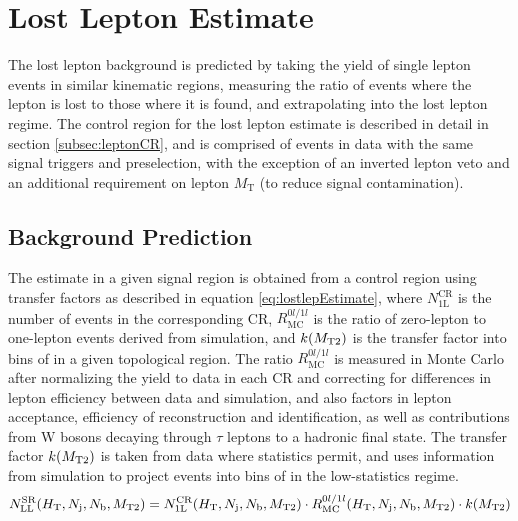\section{Lost Lepton Estimate}
\label{sec:lostlep}

The lost lepton background is predicted by taking the yield of single lepton events in similar kinematic regions, measuring the ratio of events where the lepton is lost to those where it is found, and extrapolating into the lost lepton regime. The control region for the lost lepton estimate is described in detail in section \ref{subsec:leptonCR}, and is comprised of events in data with the same signal triggers and preselection, with the exception of an inverted lepton veto and an additional requirement on lepton $M_{\mathrm{T}}$ (to reduce signal contamination). 

\subsection{Background Prediction}
\label{subsec:lostlepPrediction}

The estimate in a given signal region is obtained from a control region using transfer factors as described in equation \ref{eq:lostlepEstimate}, where $N_{\mathrm{1L}}^{\mathrm{CR}}$ is the number of events in the corresponding CR, $R_{\mathrm{MC}}^{0l/1l}$ is the ratio of zero-lepton to one-lepton events derived from simulation, and $k(M_{\mathrm{T2}})$ is the transfer factor into bins of \mttwo in a given topological region. The ratio $R_{\mathrm{MC}}^{0l/1l}$ is measured in Monte Carlo after normalizing the yield to data in each CR and correcting for differences in lepton efficiency between data and simulation, and also factors in lepton acceptance, efficiency of reconstruction and identification, as well as contributions from W bosons decaying through $\tau$ leptons to a hadronic final state. The \mttwo transfer factor $k(M_{\mathrm{T2}})$ is taken from data where statistics permit, and uses information from simulation to project events into bins of \mttwo in the low-statistics regime.
\begin{equation}
	N_{\mathrm{LL}}^{\mathrm{SR}}(H_{\mathrm{T}},N_\mathrm{j},N_\mathrm{b},M_{\mathrm{T2}}) = N_{\mathrm{1L}}^{\mathrm{CR}}(H_{\mathrm{T}},N_\mathrm{j},N_\mathrm{b},M_{\mathrm{T2}}) \cdot R_{\mathrm{MC}}^{0l/1l}(H_{\mathrm{T}},N_\mathrm{j},N_\mathrm{b},M_{\mathrm{T2}}) \cdot k(M_{\mathrm{T2}})
	\label{eq:lostlepEstimate}
\end{equation}


